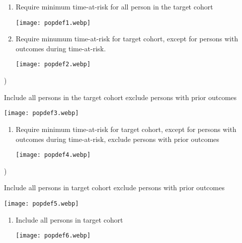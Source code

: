 \documentclass[
]{article}
\begin{document}
\begin{enumerate}
\def\labelenumi{\arabic{enumi})}
\item
  Require minimum time-at-risk for all person in the target cohort

  \texttt{[image: popdef1.webp]}
\item
  Require minumum time-at-risk for target cohort, except for persons
  with outcomes during time-at-risk.

  \texttt{[image: popdef2.webp]}
\end{enumerate}


)

Include all persons in the target cohort exclude persons with prior
outcomes

\texttt{[image: popdef3.webp]}

\begin{enumerate}
\def\labelenumi{\arabic{enumi})}
\setcounter{enumi}{3}
\item
  Require minimum time-at-risk for target cohort, except for persons
  with outcomes during time-at-risk, exclude persons with prior outcomes

  \texttt{[image: popdef4.webp]}
\end{enumerate}


)

Include all persons in target cohort exclude persons with prior outcomes

\texttt{[image: popdef5.webp]}

\begin{enumerate}
\def\labelenumi{\arabic{enumi})}
\setcounter{enumi}{5}
\item
  Include all persons in target cohort

  \texttt{[image: popdef6.webp]}
\end{enumerate}
\end{document}
